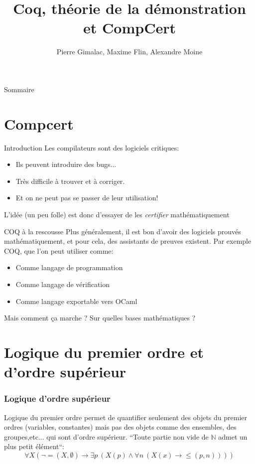 \documentclass[11pt,a4paper]{beamer}
\title{Coq, théorie de la démonstration et CompCert}
\author{Pierre Gimalac, Maxime Flin, Alexandre Moine}
\theoremstyle{plain}
\theoremstyle{definition}
\theoremstyle{remark}
\begin{document}
\maketitle

\begin{frame}{Sommaire}
\tableofcontents
\end{frame}

\section{Compcert}

\begin{frame}{Introduction}
Les compilateurs sont des logiciels critiques:
\begin{itemize}
	\item Ils peuvent introduire des bugs...
	\item Très difficile à trouver et à corriger.
	\item Et on ne peut pas se passer de leur utilisation!
\end{itemize}
L'idée (un peu folle) est donc d'essayer de les \emph{certifier} mathématiquement
\end{frame}

\begin{frame}{COQ à la rescousse}
Plus généralement, il est bon d'avoir des logiciels prouvés mathématiquement, et pour cela, des assistants de preuves existent. Par exemple COQ, que l'on peut utiliser comme:
\begin{itemize}
\item Comme langage de programmation
\item Comme langage de vérification
\item Comme langage exportable vers OCaml
\end{itemize}
Mais comment ça marche ? Sur quelles bases mathématiques ?
\end{frame}

\section{Logique du premier ordre et d'ordre supérieur}
\begin{frame}
\frametitle{Logique d'ordre supérieur}
Logique du premier ordre permet de quantifier seulement des objets du premier ordres (variables, constantes) mais pas des objets comme des ensembles, des groupes,etc... qui sont d'ordre supérieur.
\newline
\newline
``Toute partie non vide de $\mathbb{N}$ admet un plus petit élément``:
\[ \forall X \left(\neg =(X, \emptyset)\rightarrow\exists p~(X(p)\wedge\forall n~(X(x)\rightarrow \leq(p, n)))\right)\]
\end{frame}
\end{document}
